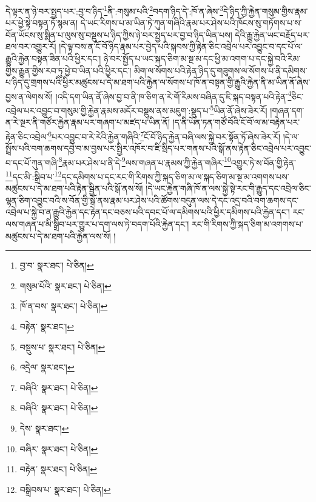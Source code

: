 དེ་ལྟར་ན་ཉེ་བར་སྤྱད་པར་:བྱ་བ་ཉིད་\footnote{བྱ་བ་  སྣར་ཐང་།  པེ་ཅིན། }ནི་:གསུམ་པའི་\footnote{གསུམ་པོའི་  སྣར་ཐང་།  པེ་ཅིན། }བདག་ཉིད་དེ་:ཁོ་ན་ཞེས་\footnote{ཁོ་ན་བས་  སྣར་ཐང་།  པེ་ཅིན། }དེ་ཉིད་ཀྱི་རྐྱེན་གསུམ་གྱིས་རྣམ་པར་ཕྱེ་སྟེ་བསྟན་ཏོ་སྙམ་ན། དེ་ཡང་རིགས་པ་མ་ཡིན་ཏེ་ཀུན་གཞིའི་རྣམ་པར་ཤེས་པའི་ཁོངས་སུ་གཏོགས་པ་ས་བོན་ཡོངས་སུ་སྨིན་པ་ལུས་སུ་བསྡུས་པ་ཉིད་ཀྱིས་ཉེ་བར་སྤྱད་པར་བྱ་བ་ཉིད་ཡིན་པས། དེའི་རྒྱུ་རྐྱེན་ཡང་བརྗོད་པར་ཐལ་བར་འགྱུར་རོ། །དེ་ལྟ་བས་ན་ངོ་བོ་ཉིད་རྣམ་པར་བྱེད་པའི་སྐབས་ཀྱི་རྟེན་ཅིང་འབྲེལ་པར་འབྱུང་བ་དང་པོ་ལ་རྒྱུའི་རྐྱེན་བསྟན་ཟིན་པའི་ཕྱིར་དང་། ཉེ་བར་སྤྱོད་པ་ཡང་སྐད་ཅིག་མ་སྔ་མ་དང་ཕྱི་མ་འགག་པ་དང་སྐྱེ་བའི་རིམ་གྱིས་རྒྱུན་གྱིས་རབ་ཏུ་ཕྱེ་བ་ཡིན་པའི་ཕྱིར་དང་། མིག་ལ་སོགས་པའི་རྟེན་ཉིད་དུ་གཟུགས་ལ་སོགས་པ་ནི་དམིགས་པ་ཉིད་དུ་གྲགས་པའི་ཕྱིར་མཚུངས་པ་དེ་མ་ཐག་པའི་རྐྱེན་ལ་སོགས་པ་ཁོ་ན་བསྟན་གྱི་རྒྱུའི་རྐྱེན་ནི་མ་ཡིན་ནོ་ཞེས་བྱས་ན་ལེགས་སོ། །འདི་དག་ཡིན་ནོ་ཞེས་བྱ་བ་ནི་ཁ་ཅིག་ན་རེ་གོ་རིམས་བཞིན་དུ་ཇི་སྐད་བསྟན་པའི་རྟེན་\footnote{བརྟེན་  སྣར་ཐང་། }ཅིང་འབྲེལ་པར་འབྱུང་བ་གསུམ་གྱི་རྐྱེན་རྣམས་མདོར་བསྡུས་ནས་མཇུག་:སྡུད་པ་\footnote{བསྡུས་པ་  སྣར་ཐང་།  པེ་ཅིན། }ཡིན་ནོ་ཞེས་ཟེར་རོ། །གཞན་དག་ན་རེ་སྔར་ནི་གཙོར་རྐྱེན་རྣམ་པར་གཞག་པ་མཛད་པ་ཡིན་ནོ། །ད་ནི་ཡོན་ཏན་གཙོ་བོའི་ངོ་བོ་ལ་མ་བརྟེན་པར་རྟེན་ཅིང་འབྲེལ་\footnote{འདྲེལ་  སྣར་ཐང་། }པར་འབྱུང་བ་རེ་རེའི་རྐྱེན་གཞིའི་\footnote{བཞིའི་  སྣར་ཐང་།  པེ་ཅིན། }ངོ་བོ་ཉིད་རྐྱེན་བཞི་ལས་སྐྱེ་བར་སྟོན་ཏོ་ཞེས་ཟེར་རོ། །དེ་ལ་སྤྲོས་པའི་བག་ཆགས་དབྱེ་བ་མ་བྱས་པར་སྤྱིར་འཁོར་བ་ཇི་སྲིད་པར་གནས་པའི་སྒོ་ནས་རྟེན་ཅིང་འབྲེལ་པར་འབྱུང་བ་དང་པོ་ཀུན་གཞི་\footnote{བཞིའི་  སྣར་ཐང་།  པེ་ཅིན། }རྣམ་པར་ཤེས་པ་ནི་དེ་\footnote{དེས་  སྣར་ཐང་། }ལས་གཞན་པ་རྣམས་ཀྱི་རྐྱེན་གཞིར་\footnote{བཞིར་  སྣར་ཐང་།  པེ་ཅིན། }འགྱུར་ཏེ་ས་བོན་གྱི་རྟེན་\footnote{བརྟེན་  སྣར་ཐང་།  པེ་ཅིན། }དང་མི་:སྒྲིབ་པ་\footnote{བསྒྲིབས་པ་  སྣར་ཐང་།  པེ་ཅིན། }དང་དམིགས་པ་དང་རང་གི་རིགས་ཀྱི་སྐད་ཅིག་མ་ལ་སྐད་ཅིག་མ་སྔ་མ་འགགས་པས་མཚུངས་པ་དེ་མ་ཐག་པའི་རྟེན་སྦྱིན་པའི་སྒོ་ནས་སོ། །དེ་ཡང་རྐྱེན་གཞི་ཁོ་ན་ལས་སྐྱེ་སྟེ་རང་གི་རྒྱུད་དང་འབྲེལ་ཅིང་ལྷན་ཅིག་འབྱུང་བའི་ས་བོན་གྱི་སྒོ་ནས་རྣམ་པར་ཤེས་པའི་ཚོགས་བདུན་ལས་དེ་དང་འདྲ་བའི་བག་ཆགས་དང་འབྲེལ་པ་སྐྱེ་བ་ན་རྒྱུའི་རྐྱེན་དང་རྟེན་དང་བཅས་པའི་དབང་པོ་ལ་དམིགས་པའི་ཕྱིར་དམིགས་པའི་རྐྱེན་དང་། རང་ལས་གཞན་པ་མི་སྒྲིབ་པར་གྱུར་པ་དག་ལས་ཏེ་བདག་པོའི་རྐྱེན་དང་། རང་གི་རིགས་ཀྱི་སྐད་ཅིག་མ་འགགས་པ་མཚུངས་པ་དེ་མ་ཐག་པའི་རྐྱེན་ལས་སོ། །
